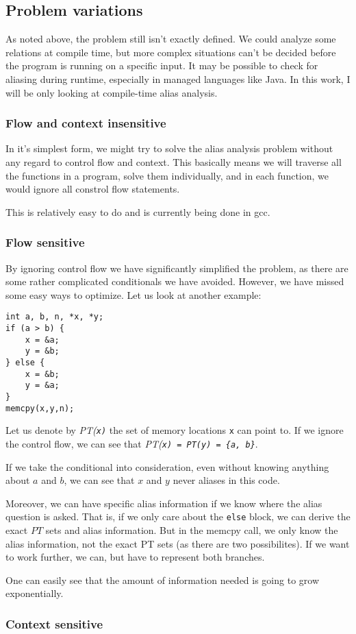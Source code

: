 \subsection{Problem variations}

As noted above, the problem still isn't exactly defined. We could analyze some
relations at compile time, but more complex situations can't be decided before
the program is running on a specific input. It may be possible to check for
aliasing during runtime, especially in managed languages like Java. In this
work, I will be only looking at compile-time alias analysis.

\subsubsection{Flow and context insensitive}

In it's simplest form, we might try to solve the alias analysis problem without
any regard to control flow and context. This basically means we will traverse
all the functions in a program, solve them individually, and in each function,
we would ignore all constrol flow statements.

This is relatively easy to do and is currently being done in gcc.

\subsubsection{Flow sensitive}

By ignoring control flow we have significantly simplified the problem, as
there are some rather complicated conditionals we have avoided. However, we have
missed some easy ways to optimize. Let us look at another example:

\begin{verbatim}
int a, b, n, *x, *y;
if (a > b) {
    x = &a;
    y = &b;
} else {
    x = &b;
    y = &a;
}
memcpy(x,y,n);
\end{verbatim}

Let us denote by {\it PT(\tt x\it)} the set of memory locations {\tt x} can
point to. If we ignore the control flow, we can see that {\it PT(\tt x\it) = PT(\tt y\it)
= \{\tt a\it, \tt b\it\}}. 

If we take the conditional into consideration, even without knowing anything about
$a$ and $b$, we can see that $x$ and $y$ never aliases in this code.

Moreover, we can have specific alias information if we know where the alias
question is asked. That is, if we only care about the {\tt else} block, we can
derive the exact $PT$ sets and alias information. But in the memcpy call, we
only know the alias information, not the exact PT sets (as there are two
possibilites). If we want to work further, we can, but have to represent both
branches.

One can easily see that the amount of information needed is going to grow
exponentially.

\subsubsection{Context sensitive}


